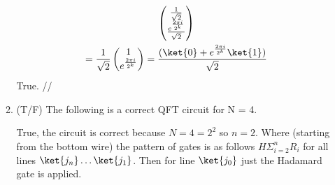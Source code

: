\documentclass[]{article}
\begin{document}
\begin{enumerate}
\begin{enumerate}
\begin{gather*}
              \begin{pmatrix}
                \frac{1}{\sqrt{2}}\\ 
                \frac{e^{\frac{2 \pi i}{2^k}}}{\sqrt{2}} 
              \end{pmatrix} \\= 
              \frac{1}{\sqrt{2}}
              \begin{pmatrix}
                1 \\
                e^{\frac{2 \pi i}{2^k}}
              \end{pmatrix}
              = \frac{(\ket{0} + e^{\frac{2\pi i}{2^k}} \ket{1})}{\sqrt{2}}
            \end{gather*}
            True. //
          \item (T/F) The following is a correct QFT circuit for N = 4.

            True, the circuit is correct because $N = 4 = 2^2$ so $n=2$. Where (starting from the bottom wire) the 
            pattern of gates is as follows $H \Sigma_{i = 2}^n R_i$ for all lines $\ket{j_n} \dots \ket{j_1}$. Then
            for line $\ket{j_0}$ just the Hadamard gate is applied.
        \end{enumerate}
    \end{enumerate}
\end{document}
